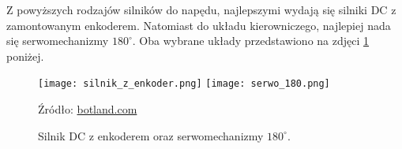             Z powyższych rodzajów silników do napędu, najlepszymi wydają się silniki DC z zamontowanym enkoderem.
            Natomiast do układu kierowniczego, najlepiej nada się serwomechanizmy $180^\circ$. Oba wybrane układy przedstawiono na zdjęci \ref{fig:engines} poniżej.
            \begin{figure}[!ht]
                \centering
                \texttt{[image: silnik\_z\_enkoder.png]}
                \texttt{[image: serwo\_180.png]}

                \caption{Silnik DC z enkoderem oraz serwomechanizmy $180^\circ$.}
                \footnotesize{Źródło: \href{https://botland.com.pl/}{botland.com}}
                \label{fig:engines}
            \end{figure}


